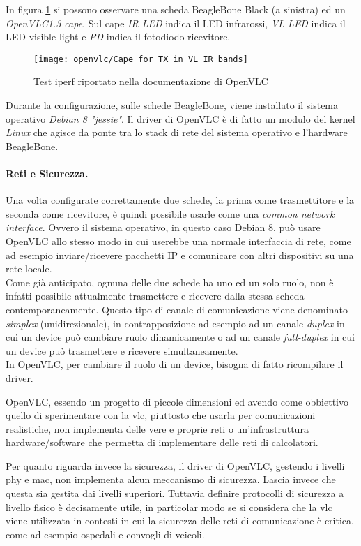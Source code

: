 In figura \ref{fig:beaglebone_cape} si possono osservare una scheda BeagleBone Black (a sinistra) ed un \textit{OpenVLC1.3 cape}. Sul cape \textit{IR LED} indica il LED infrarossi, \textit{VL LED} indica il LED visible light e \textit{PD} indica il fotodiodo ricevitore.
\begin{figure}[H] 
    \centering 
    \texttt{[image: openvlc/Cape\_for\_TX\_in\_VL\_IR\_bands]}
    \caption{Test iperf riportato nella documentazione di OpenVLC}
    \label{fig:beaglebone_cape}
\end{figure}

Durante la configurazione, sulle schede BeagleBone, viene installato il sistema operativo \textit{Debian 8 "jessie"}. Il driver di OpenVLC è di fatto un modulo del kernel \textit{Linux} che agisce da ponte tra lo stack di rete del sistema operativo e l'hardware BeagleBone.

\paragraph{Reti e Sicurezza.}
Una volta configurate correttamente due schede, la prima come trasmettitore e la seconda come ricevitore, è quindi possibile usarle come una \textit{common network interface}. Ovvero il sistema operativo, in questo caso Debian 8, può usare OpenVLC allo stesso modo in cui userebbe una normale interfaccia di rete, come ad esempio inviare/ricevere pacchetti IP e comunicare con altri dispositivi su una rete locale.\\
Come già anticipato, ognuna delle due schede ha uno ed un solo ruolo, non è infatti possibile attualmente trasmettere e ricevere dalla stessa scheda contemporaneamente. Questo tipo di canale di comunicazione viene denominato \textit{simplex} (unidirezionale), in contrapposizione ad esempio ad un canale \textit{duplex} in cui un device può cambiare ruolo dinamicamente o ad un canale \textit{full-duplex} in cui un device può trasmettere e ricevere simultaneamente.\\
In OpenVLC, per cambiare il ruolo di un device, bisogna di fatto ricompilare il driver.

OpenVLC, essendo un progetto di piccole dimensioni ed avendo come obbiettivo quello di sperimentare con la \gls{vlc}, piuttosto che usarla per comunicazioni realistiche, non implementa delle vere e proprie reti o un'infrastruttura hardware/software che permetta di implementare delle reti di calcolatori.

Per quanto riguarda invece la sicurezza, il driver di OpenVLC, gestendo i livelli \gls{phy} e \gls{mac}, non implementa alcun meccanismo di sicurezza. Lascia invece che questa sia gestita dai livelli superiori. Tuttavia definire protocolli di sicurezza a livello fisico è decisamente utile, in particolar modo se si considera che la \gls{vlc} viene utilizzata in contesti in cui la sicurezza delle reti di comunicazione è critica, come ad esempio ospedali e convogli di veicoli.

